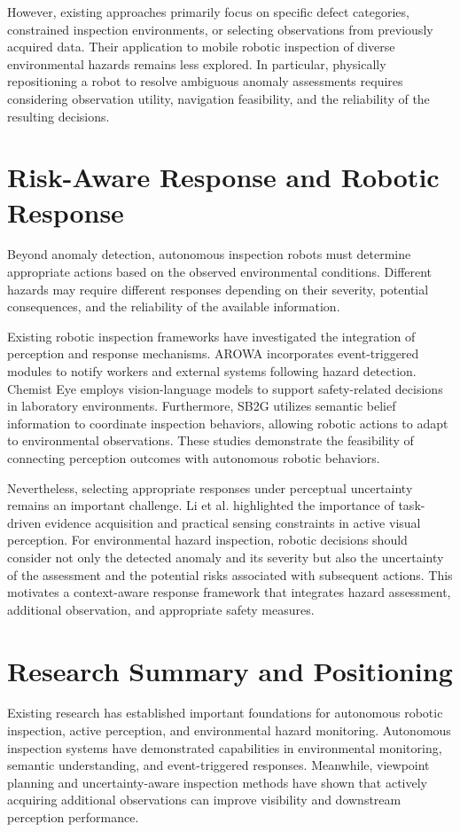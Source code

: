 However, existing approaches primarily focus on specific defect categories, constrained inspection environments, or selecting observations from previously acquired data.
Their application to mobile robotic inspection of diverse environmental hazards remains less explored.
In particular, physically repositioning a robot to resolve ambiguous anomaly assessments requires considering observation utility, navigation feasibility, and the reliability of the resulting decisions.

\section{Risk-Aware Response and Robotic Response}
Beyond anomaly detection, autonomous inspection robots must determine appropriate actions based on the observed environmental conditions.
Different hazards may require different responses depending on their severity, potential consequences, and the reliability of the available information.

Existing robotic inspection frameworks have investigated the integration of perception and response mechanisms.
AROWA \cite{konstantinidis2022arowa} incorporates event-triggered modules to notify workers and external systems following hazard detection.
Chemist Eye \cite{munguia2026chemist} employs vision-language models to support safety-related decisions in laboratory environments.
Furthermore, SB2G \cite{ginting2024sb2g} utilizes semantic belief information to coordinate inspection behaviors, allowing robotic actions to adapt to environmental observations.
These studies demonstrate the feasibility of connecting perception outcomes with autonomous robotic behaviors.

Nevertheless, selecting appropriate responses under perceptual uncertainty remains an important challenge.
Li et al. \cite{li2026activevisual} highlighted the importance of task-driven evidence acquisition and practical sensing constraints in active visual perception.
For environmental hazard inspection, robotic decisions should consider not only the detected anomaly and its severity but also the uncertainty of the assessment and the potential risks associated with subsequent actions.
This motivates a context-aware response framework that integrates hazard assessment, additional observation, and appropriate safety measures.

\section{Research Summary and Positioning}
Existing research has established important foundations for autonomous robotic inspection, active perception, and environmental hazard monitoring.
Autonomous inspection systems have demonstrated capabilities in environmental monitoring, semantic understanding, and event-triggered responses.
Meanwhile, viewpoint planning and uncertainty-aware inspection methods have shown that actively acquiring additional observations can improve visibility and downstream perception performance.

